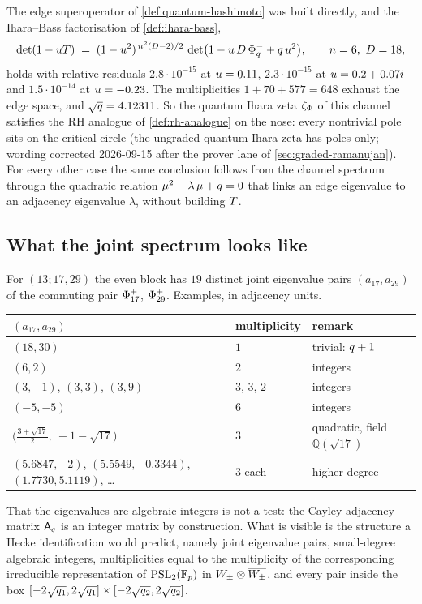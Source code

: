 The edge superoperator of \cref{def:quantum-hashimoto} was built directly, and
the Ihara--Bass factorisation of \cref{def:ihara-bass},
\[
  \det(1-uT) \;=\; (1-u^2)^{\,n^2(D-2)/2}\,
  \det\!\big(1 - u\,D\,\Phi_{q}^{-} + q\,u^2\big),
  \qquad n=6,\ D=18,
\]
holds with relative residuals $2.8\cdot10^{-15}$ at $u=0.11$,
$2.3\cdot10^{-15}$ at $u=0.2+0.07i$ and $1.5\cdot10^{-14}$ at $u=-0.23$.
The multiplicities $1+70+577 = 648$ exhaust the edge space, and
$\sqrt{q} = 4.12311$. So the quantum Ihara zeta $\zeta_{\Phi}$ of this channel
satisfies the RH analogue of \cref{def:rh-analogue} on the nose: every
nontrivial pole sits on the critical circle (the ungraded quantum Ihara zeta has poles only;
wording corrected 2026-09-15 after the prover lane of \cref{sec:graded-ramanujan}). For every other case the same
conclusion follows from the channel spectrum through the quadratic relation
$\mu^2 - \lambda\,\mu + q = 0$ that links an edge eigenvalue to an
adjacency eigenvalue $\lambda$, without building $T$.

\subsection{What the joint spectrum looks like}

For $(13;17,29)$ the even block has $19$ distinct joint eigenvalue pairs
$(a_{17}, a_{29})$ of the commuting pair $\Phi_{17}^{+}$, $\Phi_{29}^{+}$.
Examples, in adjacency units.

\begin{center}
\begin{tabular}{lll}
\toprule
$(a_{17}, a_{29})$ & multiplicity & remark \\
\midrule
$(18, 30)$ & $1$ & trivial: $q+1$ \\
$(6, 2)$ & $2$ & integers \\
$(3,-1)$, $(3,3)$, $(3,9)$ & $3$, $3$, $2$ & integers \\
$(-5,-5)$ & $6$ & integers \\
$\big(\tfrac{3+\sqrt{17}}{2},\ -1-\sqrt{17}\big)$ & $3$ & quadratic, field $\mathbb Q(\sqrt{17})$ \\
$(5.6847, -2)$, $(5.5549, -0.3344)$, $(1.7730, 5.1119)$, \dots & $3$ each & higher degree \\
\bottomrule
\end{tabular}
\end{center}

That the eigenvalues are algebraic integers is not a test: the Cayley
adjacency matrix $\mathsf A_{q}$ is an integer matrix by construction. What is
visible is the structure a Hecke identification would predict, namely joint
eigenvalue pairs, small-degree algebraic integers, multiplicities equal to the
multiplicity of the corresponding irreducible representation of $\mathrm{PSL}_2(\mathbb F_p)$ in
$W_{\pm}\otimes\overline{W_{\pm}}$, and every pair inside the box
$[-2\sqrt{q_1},2\sqrt{q_1}]\times[-2\sqrt{q_2},2\sqrt{q_2}]$.

